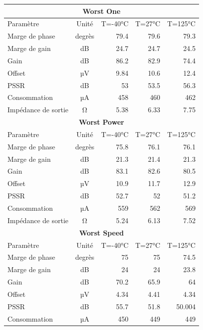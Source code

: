 \documentclass{article}
\begin{document}
\begin{center}
\begin{tabular}{|l|c|r|r|r|}
    \hline
    \multicolumn{5}{|c|}{\textbf{Worst One}}\\
    \hline
    Paramètre & Unité & T=-40°C & T=27°C & T=125°C \\
    \hline
    Marge de phase & degrès & 79.4 & 79.6 & 79.3 \\
    \hline
    Marge de gain & dB & 24.7 & 24.7 & 24.5 \\
    \hline
    Gain & dB & 86.2 & 82.9 & 74.4 \\
    \hline
    Offset & µV & 9.84 & 10.6 & 12.4 \\
    \hline
    PSSR & dB & 53 & 53.5 & 56.3 \\
    \hline
    Consommation & µA & 458 & 460 & 462 \\
    \hline
    Impédance de sortie & Ω & 5.38 & 6.33 & 7.75 \\
    \hline
    \multicolumn{5}{|c|}{\textbf{Worst Power}}\\
    \hline
    Paramètre & Unité & T=-40°C & T=27°C & T=125°C \\
    \hline
    Marge de phase & degrès & 75.8 & 76.1 & 76.1 \\
    \hline
    Marge de gain & dB & 21.3 & 21.4 & 21.3 \\
    \hline
    Gain & dB & 83.1 & 82.6 & 80.5 \\
    \hline
    Offset & µV & 10.9 & 11.7 & 12.9 \\
    \hline
    PSSR & dB & 52.7 & 52 & 51.2 \\
    \hline
    Consommation & µA & 559 & 562 & 569 \\
    \hline
    Impédance de sortie & Ω & 5.24 & 6.13 & 7.52 \\
    \hline
    \multicolumn{5}{|c|}{\textbf{Worst Speed}}\\
    \hline
    Paramètre & Unité & T=-40°C & T=27°C & T=125°C \\
    \hline
    Marge de phase & degrès & 75 & 75 & 74.5 \\
    \hline
    Marge de gain & dB & 24 & 24 & 23.8 \\
    \hline
    Gain & dB & 70.2 & 65.9 & 64 \\
    \hline
    Offset & µV & 4.34 & 4.41 & 4.34 \\
    \hline
    PSSR & dB & 55.7 & 51.8 & 50.004 \\
    \hline
    Consommation & µA & 450 & 449 & 449 \\

\end{tabular}
\end{center}
\end{document}
